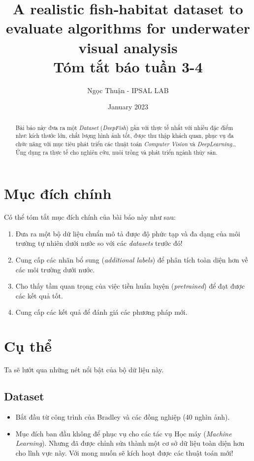 \documentclass{article}
\title{A realistic fish‑habitat dataset
to evaluate algorithms
for underwater visual analysis \\ \Large Tóm tắt báo tuần 3-4}
\author{Ngọc Thuận - IPSAL LAB}
\date{January 2023}
\begin{document}
\maketitle
\begin{abstract}
    Bài báo này đưa ra một \textit{Dataset} (\textit{DeepFish}) gần với thực tế nhất với nhiều đặc điểm như: kích thước lớn, chất lượng hình ảnh tốt, được thu thập khách quan, phục vụ đa chức năng với mục tiêu phát triển các thuật toán \textit{Computer Vision} và \textit{DeepLearning}\ldots Ứng dụng ra thực tế cho nghiên cứu, nuôi trồng và phát triển ngành thủy sản.
\end{abstract}

    \section{Mục đích chính}
    Có thể tóm tắt mục đích chính của bài báo này như sau:
    \begin{enumerate}
        \item Đưa ra một bộ dữ liệu chuẩn mô tả được độ phức tạp và đa dạng của môi trường tự nhiên dưới nước so với các \textit{datasets} trước đó!
        \item Cung cấp các nhãn bổ sung (\textit{additional labels}) để phân tích toàn diện hơn về các môi trường dưới nước.
        \item Cho thấy tầm quan trọng của việc tiền huấn luyện (\textit{pretrained}) để đạt được các kết quả tốt.
        \item Cung cấp các kết quả để đánh giá các phương pháp mới.
    \end{enumerate}
    \section{Cụ thể}
        Ta sẽ lướt qua những nét nổi bật của bộ dữ liệu này.
        \subsection{Dataset}
        \begin{itemize}
            \item Bắt đầu từ công trình của Bradley và các đồng nghiệp (40 nghìn ảnh).
            \item Mục đích ban đầu không để phục vụ cho các tác vụ Học máy (\textit{Machine Learning}). Nhưng đã được chỉnh sửa thành một cơ sở dữ liệu toàn diện hơn cho lĩnh vực này. Với mong muốn sẽ kích hoạt được các thuật toán mới!
        \end{itemize}
\end{document}
